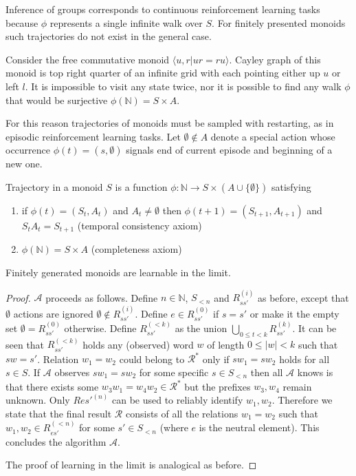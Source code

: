 \documentclass[oneside,english,logo]{amuthesis}
\begin{document}
Inference of groups corresponds to continuous reinforcement learning tasks because $\phi$ represents a single infinite walk over $S$.
For finitely presented monoids such trajectories do not exist in the general case. 
\begin{example}
Consider the free commutative monoid $\langle u,r | ur=ru \rangle$. Cayley graph of this monoid is top right quarter of an infinite grid with each pointing either up $u$ or left $l$. It is impossible to visit any state twice, nor it is possible to find any walk $\phi$ that would be surjective $\phi(\mathbb{N})=S\times A$.
\end{example}
 For this reason trajectories of monoids must be sampled with restarting, as in episodic reinforcement learning tasks. Let $\emptyset\notin A$ denote a special action whose occurrence $\phi(t)=(s,\emptyset)$ signals end of current episode and beginning of a new one. 
\begin{definition}
Trajectory in a monoid $S$ is a function $\phi : \mathbb{N} \rightarrow S \times (A\cup\{\emptyset\})$ satisfying
\begin{enumerate}
		\item if $\phi(t)=(S_t,A_t)$ and $A_t\ne \emptyset$ then $\phi(t+1)=(S_{t+1},A_{t+1})$ and $S_tA_t = S_{t+1}$   (temporal consistency axiom)
		\item $\phi(\mathbb{N}) = S \times A$ (completeness axiom)
\end{enumerate}
\end{definition}
\begin{theorem}
Finitely generated monoids are learnable in the limit. \label{subsection:inductive_inference_of_monoids} \label{theorem:finitely_presented_monoids_are_learnable}
\end{theorem}
\begin{proof}
$\mathcal{A}$ proceeds as follows. Define $n \in \mathbb{N}$, $S_{<n}$ and $R_{ss'}^{(i)}$ as before, except that $\emptyset$ actions are ignored $\emptyset \notin R_{ss'}^{(i)}$. Define $e \in R_{ss'}^{(0)}$ if $s=s'$ or make it the empty set $\emptyset=R_{ss'}^{(0)}$ otherwise. Define $R_{ss'}^{(<k)}$ as the union $\bigcup_{0 \le t< k} R_{ss'}^{(k)}$. It can be seen that $R_{ss'}^{(< k)}$ holds any (observed) word $w$ of length $0\le|w|< k$ such that $sw=s'$. Relation $w_1=w_2$ could belong to $\mathcal{R}^*$ only if $sw_1=sw_2$ holds for all $s\in S$. If $\mathcal{A}$ observes $sw_1=sw_2$ for some specific $s\in S_{<n}$ then all $\mathcal{A}$ knows is that there exists some $w_3w_1=w_4w_2 \in \mathcal{R}^*$ but the prefixes $w_3,w_4$ remain unknown. Only $R{es'}^{(n)}$ can be used to reliably identify $w_1,w_2$. Therefore we state that the final result $\mathcal{R}$ consists of all the relations $w_1=w_2$ such that $w_1,w_2 \in R_{es'}^{(<n)}$ for some $s'\in S_{<n}$ (where $e$ is the neutral element). This concludes the algorithm $\mathcal{A}$. 

The proof of learning in the limit is analogical as before.
\end{proof}
\end{document}
